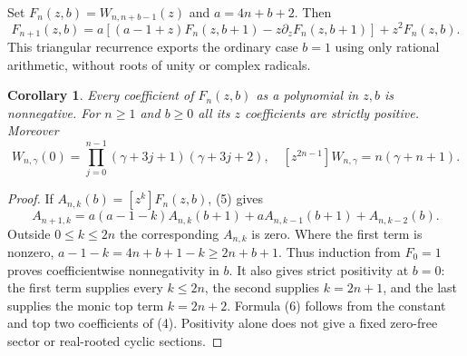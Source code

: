 \documentclass[11pt]{article}
\newtheorem{corollary}[theorem]{Corollary}
\begin{document}
Set $F_n(z,b)=W_{n,n+b-1}(z)$ and $a=4n+b+2$. Then
\[
 F_{n+1}(z,b)=a[(a-1+z)F_n(z,b+1)-z\partial_zF_n(z,b+1)]
                                           +z^2F_n(z,b).     \tag{5}
\]
This triangular recurrence exports the ordinary case $b=1$ using only
rational arithmetic, without roots of unity or complex radicals.

\begin{corollary}\label{cor:positive}
Every coefficient of $F_n(z,b)$ as a polynomial in $z,b$ is nonnegative.
For $n\ge1$ and $b\ge0$ all its $z$ coefficients are strictly positive.
Moreover
\[
 W_{n,\gamma}(0)=\prod_{j=0}^{n-1}(\gamma+3j+1)(\gamma+3j+2),
 \quad [z^{2n-1}]W_{n,\gamma}=n(\gamma+n+1).                 \tag{6}
\]
\end{corollary}
\begin{proof}
If $A_{n,k}(b)=[z^k]F_n(z,b)$, (5) gives
\[
 A_{n+1,k}=a(a-1-k)A_{n,k}(b+1)
          +aA_{n,k-1}(b+1)+A_{n,k-2}(b).                    \tag{7}
\]
Outside $0\le k\le2n$ the corresponding $A_{n,k}$ is zero.
Where the first term is nonzero, $a-1-k=4n+b+1-k\ge2n+b+1$.
Thus induction from $F_0=1$ proves coefficientwise nonnegativity in
$b$. It also gives strict positivity at $b=0$: the first term supplies
every $k\le2n$, the second supplies $k=2n+1$, and the last supplies
the monic top term $k=2n+2$. Formula (6) follows from the constant and
top two coefficients of (4). Positivity alone does not give a fixed
zero-free sector or real-rooted cyclic sections.
\end{proof}
\end{document}
